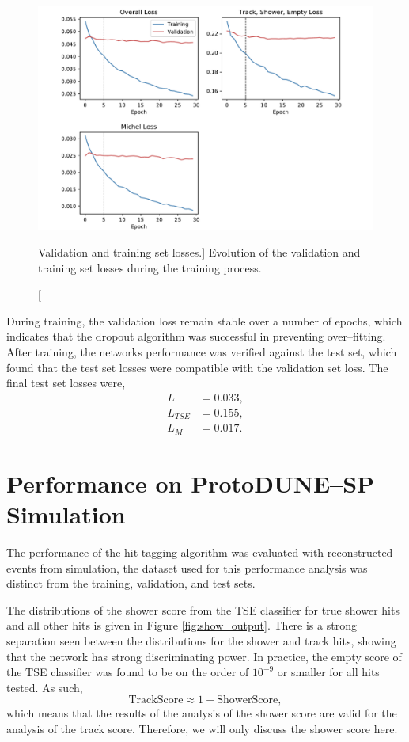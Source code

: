 \begin{figure}
	\centering
	\includegraphics[width=\textwidth]{figures/losses_prelu.pdf}
	\caption
	[Validation and training set losses.]
	{Evolution of the validation and training set losses during the training 
	process.} 
	\label{fig:training}
\end{figure}

During training, the validation loss remain stable over a number of epochs,
which indicates that the dropout algorithm was successful in preventing
over--fitting. After training, the networks performance was verified against 
the test set, which found that the test set losses were compatible with the 
validation set loss. The final test set losses were, 
\begin{align*}
	L &       = 0.033, \\
	L_{TSE} & = 0.155, \\
	L_M &     = 0.017.
\end{align*}

\section{Performance on ProtoDUNE--SP Simulation} \label{cnn-perf-sim}

The performance of the hit tagging algorithm was evaluated with reconstructed
events from \protodune{} simulation, the dataset used for this performance
analysis was distinct from the training, validation, and test sets. 

The distributions of the shower score from the TSE classifier for true shower 
hits and all other hits is given in Figure \ref{fig:show_output}. There is a 
strong separation seen between the distributions for the shower and track 
hits, showing that the network has strong discriminating power. In practice, the
empty score of the TSE classifier was found to be on the order of $10^{-9}$ or
smaller for all hits tested. As such,
\begin{equation*}
	\mbox{TrackScore} \approx 1 - \mbox{ShowerScore},
\end{equation*}
which means that the results of the analysis of the shower score are valid for
the analysis of the track score. Therefore, we will only discuss the shower
score here.

